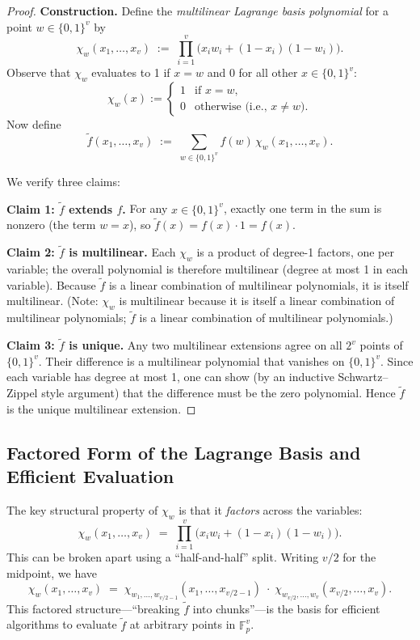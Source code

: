 \documentclass[11pt]{article}
\theoremstyle{plain}
\theoremstyle{definition}
\begin{document}
\begin{proof}
\textbf{Construction.} Define the \emph{multilinear Lagrange basis polynomial} for a point
$w \in \{0,1\}^v$ by
\[
  \chi_w(x_1, \ldots, x_v)
  \;:=\;
  \prod_{i=1}^{v} \bigl( x_i w_i + (1 - x_i)(1 - w_i) \bigr).
\]
Observe that $\chi_w$ evaluates to 1 if $x = w$ and 0 for all other $x \in \{0,1\}^v$:
\[
  \chi_w(x) :=
  \begin{cases}
    1 & \text{if } x = w, \\
    0 & \text{otherwise (i.e., } x \neq w\text{)}.
  \end{cases}
\]
Now define
\[
  \widetilde{f}(x_1, \ldots, x_v)
  \;:=\;
  \sum_{w \in \{0,1\}^v} f(w)\,\chi_w(x_1, \ldots, x_v).
\]

We verify three claims:

\medskip
\textbf{Claim 1: $\widetilde{f}$ extends $f$.}
For any $x \in \{0,1\}^v$, exactly one term in the sum is nonzero (the term $w = x$), so
$\widetilde{f}(x) = f(x) \cdot 1 = f(x)$.

\medskip
\textbf{Claim 2: $\widetilde{f}$ is multilinear.}
Each $\chi_w$ is a product of degree-1 factors, one per variable; the overall polynomial
is therefore multilinear (degree at most 1 in each variable).
Because $\widetilde{f}$ is a linear combination of multilinear polynomials, it is itself
multilinear.
(Note: $\chi_w$ is multilinear because it is itself a linear combination of multilinear
polynomials; $\widetilde{f}$ is a linear combination of multilinear polynomials.)

\medskip
\textbf{Claim 3: $\widetilde{f}$ is unique.}
Any two multilinear extensions agree on all $2^v$ points of $\{0,1\}^v$.
Their difference is a multilinear polynomial that vanishes on $\{0,1\}^v$.
Since each variable has degree at most 1, one can show (by an inductive Schwartz--Zippel
style argument) that the difference must be the zero polynomial.
Hence $\widetilde{f}$ is the unique multilinear extension.
\end{proof}

\subsection{Factored Form of the Lagrange Basis and Efficient Evaluation}

The key structural property of $\chi_w$ is that it \emph{factors} across the variables:
\[
  \chi_w(x_1, \ldots, x_v)
  \;=\;
  \prod_{i=1}^{v} \bigl( x_i w_i + (1-x_i)(1-w_i) \bigr).
\]
This can be broken apart using a ``half-and-half'' split.
Writing $v/2$ for the midpoint, we have
\[
  \chi_w(x_1, \ldots, x_v)
  \;=\;
  \chi_{w_1,\ldots,w_{v/2-1}}(x_1, \ldots, x_{v/2-1})
  \;\cdot\;
  \chi_{w_{v/2},\ldots,w_{v}}(x_{v/2}, \ldots, x_v).
\]
This factored structure---``breaking $\widetilde{f}$ into chunks''---is the basis for efficient
algorithms to evaluate $\widetilde{f}$ at arbitrary points in $\mathbb{F}_p^v$.
\end{document}
